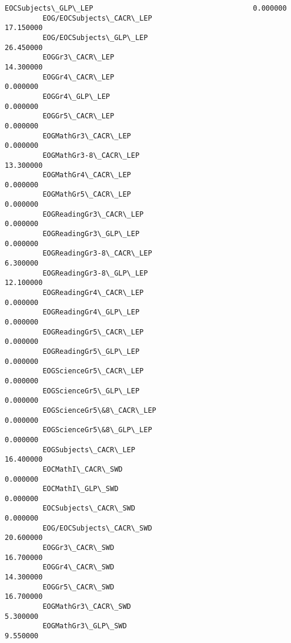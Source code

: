 \documentclass[11pt]{article}
\begin{document}
\begin{Verbatim}[commandchars=\\\{\}]
         EOCSubjects\_GLP\_LEP                                      0.000000   
         EOG/EOCSubjects\_CACR\_LEP                                17.150000   
         EOG/EOCSubjects\_GLP\_LEP                                 26.450000   
         EOGGr3\_CACR\_LEP                                         14.300000   
         EOGGr4\_CACR\_LEP                                          0.000000   
         EOGGr4\_GLP\_LEP                                           0.000000   
         EOGGr5\_CACR\_LEP                                          0.000000   
         EOGMathGr3\_CACR\_LEP                                      0.000000   
         EOGMathGr3-8\_CACR\_LEP                                   13.300000   
         EOGMathGr4\_CACR\_LEP                                      0.000000   
         EOGMathGr5\_CACR\_LEP                                      0.000000   
         EOGReadingGr3\_CACR\_LEP                                   0.000000   
         EOGReadingGr3\_GLP\_LEP                                    0.000000   
         EOGReadingGr3-8\_CACR\_LEP                                 6.300000   
         EOGReadingGr3-8\_GLP\_LEP                                 12.100000   
         EOGReadingGr4\_CACR\_LEP                                   0.000000   
         EOGReadingGr4\_GLP\_LEP                                    0.000000   
         EOGReadingGr5\_CACR\_LEP                                   0.000000   
         EOGReadingGr5\_GLP\_LEP                                    0.000000   
         EOGScienceGr5\_CACR\_LEP                                   0.000000   
         EOGScienceGr5\_GLP\_LEP                                    0.000000   
         EOGScienceGr5\&8\_CACR\_LEP                                 0.000000   
         EOGScienceGr5\&8\_GLP\_LEP                                  0.000000   
         EOGSubjects\_CACR\_LEP                                    16.400000   
         EOCMathI\_CACR\_SWD                                        0.000000   
         EOCMathI\_GLP\_SWD                                         0.000000   
         EOCSubjects\_CACR\_SWD                                     0.000000   
         EOG/EOCSubjects\_CACR\_SWD                                20.600000   
         EOGGr3\_CACR\_SWD                                         16.700000   
         EOGGr4\_CACR\_SWD                                         14.300000   
         EOGGr5\_CACR\_SWD                                         16.700000   
         EOGMathGr3\_CACR\_SWD                                      5.300000   
         EOGMathGr3\_GLP\_SWD                                       9.550000   

\end{Verbatim}
\end{document}

